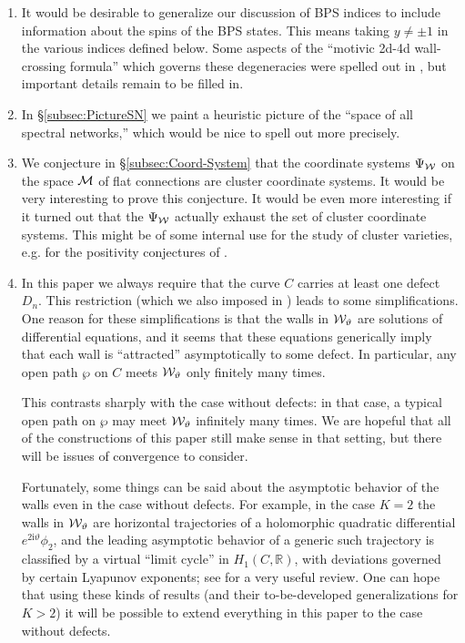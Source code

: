 \documentclass[11pt,a4paper]{article}
\def\IR{{\mathbb{R}}}
\def\CM {{\cal M}}
\def\wnet {{\cal W}}
\def\IR{{\mathbb{R}}}
\def\CM {{\cal M}}
\def\wnet {{\cal W}}
\newcommand\I{{\mathrm i}}
\begin{document}
\begin{enumerate}
\item It would be desirable to generalize our discussion of BPS indices to include
information about the spins of the BPS states.  This means taking $y\not=\pm 1$
in the various indices defined below.  Some aspects of the ``motivic 2d-4d wall-crossing
formula'' which governs these degeneracies were spelled out in
\cite{Gaiotto:2011tf}, but important details remain to be filled in.

\item In \S \ref{subsec:PictureSN} we paint a heuristic picture of the ``space of all spectral networks,''
which would be nice to spell out more precisely.

\item We conjecture in \S \ref{subsec:Coord-System}
that the coordinate systems $\Psi_\wnet$ on the space $\CM$ of flat connections
are cluster coordinate systems.  It would be very interesting to prove this conjecture.
It would be even more interesting if it turned out that the $\Psi_\wnet$ actually exhaust the set of cluster coordinate systems.
This might be of some internal
use for the study of cluster varieties, e.g. for the positivity conjectures of \cite{MR2233852}.

\item In this paper we always require that the curve $C$ carries at least one defect $D_n$.
This restriction (which we also imposed in \cite{Gaiotto:2009hg})
leads to some simplifications.  One reason for these simplifications is
that the walls in $\wnet_\vartheta$ are solutions of differential equations, and it seems that
these equations generically imply that each wall is ``attracted'' asymptotically to some
defect.  In particular, any open path $\wp$ on $C$ meets $\wnet_\vartheta$ only finitely many times.

This contrasts sharply with
the case without defects:  in that case, a typical open path on $\wp$
may meet $\wnet_\vartheta$ infinitely many times.
We are hopeful that all of the constructions of this paper still make sense in that setting, but there will
be issues of convergence to consider.

Fortunately, some things can be said about the asymptotic behavior of the walls
even in the case without defects.
For example, in the case $K=2$ the walls in $\wnet_\vartheta$ are horizontal
trajectories of a holomorphic quadratic differential $e^{2 \I \vartheta} \phi_2$,
and the leading
asymptotic behavior of a generic such trajectory is classified by a virtual ``limit cycle'' in $H_1(C, \IR)$, with deviations
governed by certain Lyapunov exponents; see \cite{flat-surfaces} for a very useful review.  One can hope that using these kinds of results
(and their to-be-developed generalizations for $K>2$) it will be possible to extend everything in this paper to the
case without defects.


\end{enumerate}
\end{document}
